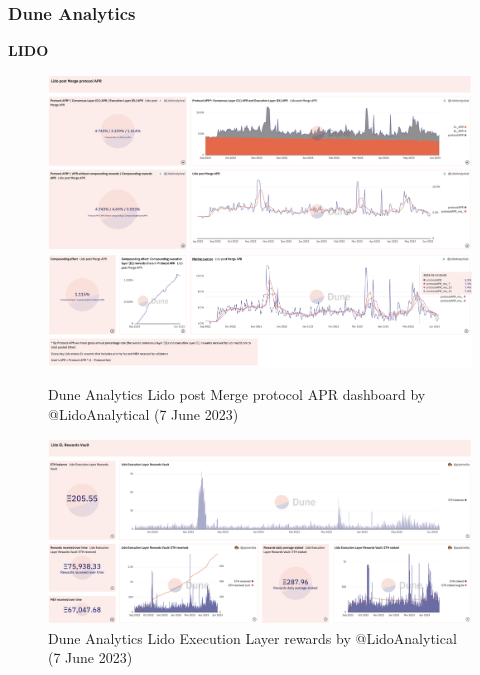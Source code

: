 \documentclass[UTF8]{article}
\begin{document}
\subsubsection*{Dune Analytics}
\textbf{LIDO}
\begin{figure}[htbp]
\begin{center}
\includegraphics[width=\linewidth]{images/dunelido1}\\
\includegraphics[width=\linewidth]{images/dunelido2}
\caption{Dune Analytics Lido post Merge protocol APR dashboard by @LidoAnalytical  (7 June 2023)}
\label{fig:dunelido1}
\end{center}
\end{figure}

\begin{figure}[htbp]
\begin{center}
\includegraphics[width=\linewidth]{images/dunelido3}
\caption{Dune Analytics Lido Execution Layer rewards by @LidoAnalytical  (7 June 2023)}
\label{fig:dunelido3}
\end{center}
\end{figure}
\end{document}
